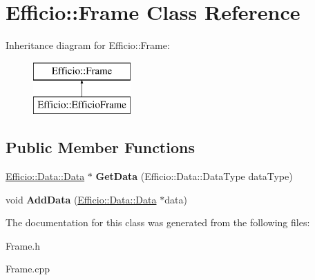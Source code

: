 \hypertarget{class_efficio_1_1_frame}{}\section{Efficio\+:\+:Frame Class Reference}
\label{class_efficio_1_1_frame}
Inheritance diagram for Efficio\+:\+:Frame\+:\begin{figure}[H]
\begin{center}
\leavevmode
\includegraphics[height=2.000000cm]{class_efficio_1_1_frame}
\end{center}
\end{figure}
\subsection*{Public Member Functions}
\begin{DoxyCompactItemize}
\item 
\hyperlink{class_efficio_1_1_data_1_1_data}{Efficio\+::\+Data\+::\+Data} $\ast$ {\bfseries Get\+Data} (Efficio\+::\+Data\+::\+Data\+Type data\+Type)\hypertarget{class_efficio_1_1_frame_a7f3524244cf2e511881161d525d445ea}{}\label{class_efficio_1_1_frame_a7f3524244cf2e511881161d525d445ea}

\item 
void {\bfseries Add\+Data} (\hyperlink{class_efficio_1_1_data_1_1_data}{Efficio\+::\+Data\+::\+Data} $\ast$data)\hypertarget{class_efficio_1_1_frame_a7c1ad4c47f3ff7b49d3c2942184c43fb}{}\label{class_efficio_1_1_frame_a7c1ad4c47f3ff7b49d3c2942184c43fb}

\end{DoxyCompactItemize}


The documentation for this class was generated from the following files\+:\begin{DoxyCompactItemize}
\item 
Frame.\+h\item 
Frame.\+cpp\end{DoxyCompactItemize}
